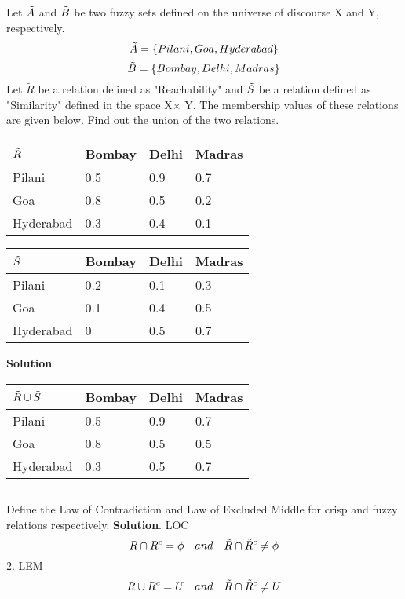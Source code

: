 \documentclass{article}
\begin{document}
{\subsection{}
Let $\Tilde{A}$ and $\Tilde{B}$ be two fuzzy sets defined on the universe of discourse X and Y, respectively.
\[\Tilde{A}=\{{Pilani,Goa,Hyderabad}\}\]
\[\Tilde{B}=\{{Bombay,Delhi,Madras}\}\]
Let $\tilde{R}$ be a relation defined as "Reachability" and $\Tilde{S}$ be a relation defined as "Similarity" defined in the space X$\times$ Y. The membership values of these relations are given below. Find out the union of the two relations.
\begin{center}
\def\arraystretch{1.4}%
\begin{tabular}{ | m{1.6cm} | m{1.2cm}| m{1cm} | m{1.1cm}| } 
  \hline
  $\Tilde{R}$ & Bombay & Delhi & Madras \\ 
  \hline
  Pilani & 0.5 & 0.9 & 0.7 \\ 
  \hline
  Goa & 0.8 & 0.5 & 0.2\\ 
  \hline
  Hyderabad & 0.3 & 0.4 & 0.1 \\ 
  \hline
\end{tabular}
\quad
    \def\arraystretch{1.4}%
\begin{tabular}{ | m{1.6cm} | m{1.2cm}| m{1.4cm} | m{1.1cm}| } 
  \hline
  $\Tilde{S}$ & Bombay & Delhi & Madras \\ 
  \hline
  Pilani & 0.2 & 0.1 & 0.3 \\ 
  \hline
  Goa & 0.1 & 0.4 & 0.5\\ 
  \hline
  Hyderabad & 0 & 0.5 & 0.7 \\ 
  \hline
\end{tabular}
\end{center}
\textbf{Solution}\newline
\begin{center}
    \def\arraystretch{1.4}%
\begin{tabular}{ | m{1.6cm} | m{1.2cm}| m{1.4cm} | m{1.1cm}| } 
  \hline
  $\Tilde{R}\cup\Tilde{S}$ & Bombay & Delhi & Madras \\ 
  \hline
  Pilani & 0.5 & 0.9 & 0.7 \\ 
  \hline
  Goa & 0.8 & 0.5 & 0.5\\ 
  \hline
  Hyderabad & 0.3 & 0.5 & 0.7 \\ 
  \hline
\end{tabular}
\end{center}
\subsection{}
Define the Law of Contradiction and Law of Excluded Middle for crisp and fuzzy relations respectively.
\newline\textbf{Solution}\newline{}. LOC
\[R\cap R^c=\phi\quad and \quad\Tilde{R}\cap\Tilde{R}^c\neq\phi\]
2. LEM
\[R\cup R^c=U\quad and \quad\Tilde{R}\cap\Tilde{R}^c\neq U\]

}
\end{document}
